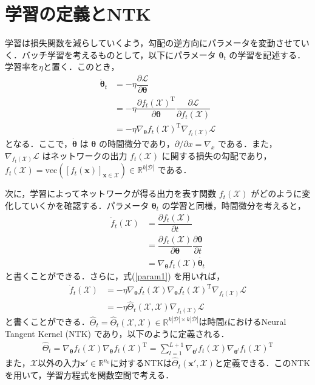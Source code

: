 \section{学習の定義とNTK}
\label{learning_def_NTK}
学習は損失関数を減らしていくよう，勾配の逆方向にパラメータを変動させていく．バッチ学習を考えるものとして，以下にパラメータ $\bm{\theta}_t$ の学習を記述する．学習率を$\eta$と置く．このとき，
\begin{align}
    \dot{\bm{\theta}}_t &= -\eta \dfrac{\partial \mathcal{L}}{\partial \bm{\theta}} \\
    &= -\eta \dfrac{\partial f_t(\mathcal{X})^{\mathrm{T}}}{\partial \bm{\theta}} \dfrac{\partial \mathcal{L}}{\partial f_t(\mathcal{X})} \\
    &= -\eta \nabla_{\bm{\theta}}f_t(\mathcal{X})^{\mathrm{T}}\nabla_{f_t(\mathcal{X})}\mathcal{L} \label{param1}
\end{align}
となる．ここで，$\dot{\bm{\theta}}$ は $\bm{\theta}$ の時間微分であり，$\partial/\partial x = \nabla_x$ である．また，$\nabla_{f_t(\mathcal{X})}\mathcal{L}$ はネットワークの出力 $f_t(\mathcal{X})$ に関する損失の勾配であり，$f_t(\mathcal{X}) = \mbox{vec}([f_t(\bm{x})]_{\bm{x} \in \mathcal{X}}) \in \mathbb{R}^{k|\mathcal{D}|}$ である．

次に，学習によってネットワークが得る出力を表す関数 $f_t(\mathcal{X})$ がどのように変化していくかを確認する．パラメータ $\bm{\theta}_t$ の学習と同様，時間微分を考えると，
\begin{align}
    \dot{f}_t(\mathcal{X}) &= \dfrac{\partial f_t(\mathcal{X})}{\partial t} \\
    &= \dfrac{\partial f_t(\mathcal{X})}{\partial \bm{\theta}} \dfrac{\partial \bm{\theta}}{\partial t} \\
    &= \nabla_{\bm{\theta}}f_t(\mathcal{X})\dot{\bm{\theta}_t}
\end{align}
と書くことができる．さらに，式(\ref{param1}) を用いれば，
\begin{align}
    \dot{f}_t(\mathcal{X}) &=  -\eta\nabla_{\bm{\theta}}f_t(\mathcal{X})\nabla_{\bm{\theta}}f_t(\mathcal{X})^{\mathrm{T}}\nabla_{f_t(\mathcal{X})}\mathcal{L} \\
    &= -\eta\hat{\Theta}_t(\mathcal{X}, \mathcal{X})\nabla_{f_t(\mathcal{X})}\mathcal{L} \label{func_learning}
\end{align}
と書くことができる．$\hat{\Theta}_t = \hat{\Theta}_t(\mathcal{X}, \mathcal{X}) \in \mathbb{R}^{k|\mathcal{D}| \times k|\mathcal{D}|}$は時間$t$におけるNeural Tangent Kernel (NTK) であり，以下のように定義される．
\begin{align}
    \hat{\Theta}_t = \nabla_{\bm{\theta}}f_t(\mathcal{X})\nabla_{\bm{\theta}}f_t(\mathcal{X})^{\mathrm{T}} = \sum_{l=1}^{L+1} \nabla_{\bm{\theta}^l}f_t(\mathcal{X})\nabla_{\bm{\theta}^l}f_t(\mathcal{X})^{\mathrm{T}}
\end{align}
また，$\mathcal{X}$以外の入力$\bm{x}' \in \mathbb{R}^{n_0}$に対するNTKは$\hat{\Theta}_t(\bm{x}', \mathcal{X})$と定義できる．このNTKを用いて，学習方程式を関数空間で考える．


